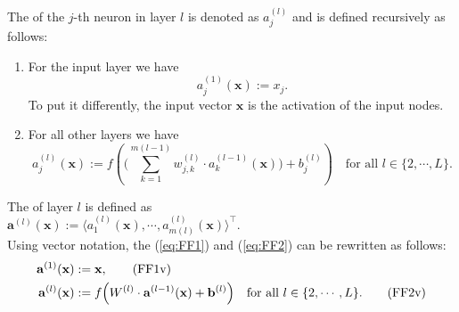 \noindent
The  of the $j$-th neuron
in layer $l$ is denoted as $a_j^{(l)}$ and is defined recursively as follows:
\begin{enumerate}
\item For the input layer we have
      \begin{equation}
        \label{eq:FF1}
       a^{(1)}_j(\mathbf{x}) := x_j.
       \tag{FF1}
      \end{equation}
      To put it differently, the input vector $\mathbf{x}$ is the activation of the input nodes.
\item For all other layers we have
      \begin{equation}
         \label{eq:FF2}
         a_j^{(l)}(\mathbf{x}) := 
             f\left(\Biggl(\sum\limits_{k=1}^{m(l-1)} w_{j,k}^{(l)}\cdot a_k^{(l-1)}(\mathbf{x})\Biggr) + b_{j}^{(l)}\right) 
        \quad \mbox{for all $l \in \{2, \cdots, L\}$}.
       \tag{FF2}
\end{equation}
\end{enumerate}
The   of layer $l$ is defined as
\\[0.2cm]
\hspace*{1.3cm}
$\mathbf{a}^{(l)}(\mathbf{x}) := \bigl\langle a_1^{(l)}(\mathbf{x}), \cdots, a_{m(l)}^{(l)}(\mathbf{x}) \bigr\rangle^\top$.
\\[0.2cm]
Using vector notation, the  
(\ref{eq:FF1}) and (\ref{eq:FF2}) can be rewritten as follows:
\begin{align}
  \label{eq:FF1v}
  \mathbf{a}^{(1)}(\mathbf{x}) & := \mathbf{x},
  \tag{FF1v} \\ 
  \label{eq:FF2v}
  \mathbf{a}^{(l)}(\mathbf{x}) & := 
  f\Bigl( W^{(l)} \cdot \mathbf{a}^{(l-1)}(\mathbf{x}) + \mathbf{b}^{(l)}\Bigr)
  \quad \mbox{for all $l \in \{2, \cdots, L\}$}.
  \tag{FF2v}
\end{align}

